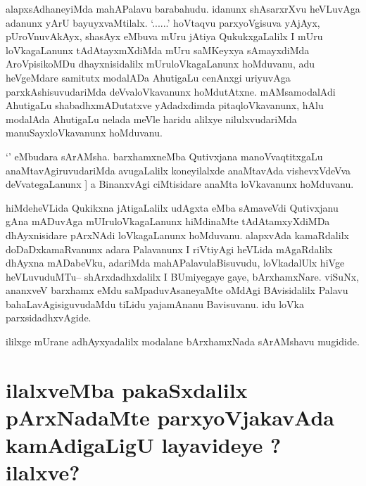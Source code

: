 \begin{artha}
alapxsAdhaneyiMda mahAPalavu barabahudu. idanunx shAsarxrXvu heVLuvAga adanunx yArU bayuyxvaMtilalx. `\stext ......' hoVtaqvu parxyoVgisuva yAjAyx, pUroVnuvAkAyx, shasAyx eMbuva mUru jAtiya QukukxgaLalilx I mUru loVkagaLanunx tAdAtayxmXdiMda  mUru saMKeyxya sAmayxdiMda AroVpisikoMDu dhayxnisidalilx mUruloVkagaLanunx hoMduvanu, adu heVgeMdare samitutx modalADa AhutigaLu cenAnxgi uriyuvAga parxkAshisuvudariMda deVvaloVkavanunx hoMdutAtxne. mAMsamodalAdi AhutigaLu shabadhxmADutatxve yAdadxdimda pitaqloVkavanunx, hAlu modalAda AhutigaLu nelada meVle haridu alilxye nilulxvudariMda manuSayxloVkavanunx hoMduvanu.

`\stext' eMbudara sArAMsha. barxhamxneMba Qutivxjana manoVvaqtitxgaLu 
anaMtavAgiruvudariMda avugaLalilx koneyilalxde anaMtavAda vishevxVdeVva deVvategaLanunx ]
a BinanxvAgi ciMtisidare anaMta loVkavanunx hoMduvanu.
\end{artha}

\begin{center}
\end{center}

\begin{artha}
hiMdeheVLida  Qukikxna jAtigaLalilx udAgxta eMba sAmaveVdi Qutivxjanu  gAna mADuvAga mUIruloVkagaLanunx hiMdinaMte tAdAtamxyXdiMDa dhAyxnisidare pArxNAdi loVkagaLanunx hoMduvanu. alapxvAda kamaRdalilx doDaDxkamaRvanunx adara Palavanunx I riVtiyAgi heVLida mAgaRdalilx dhAyxna mADabeVku, adariMda mahAPalavulaBisuvudu, loVkadalUlx hiVge heVLuvuduMTu-- shArxdadhxdalilx I BUmiyegaye gaye, bArxhamxNare. viSuNx, ananxveV barxhamx eMdu saMpaduvAsaneyaMte oMdAgi BAvisidalilx Palavu bahaLavAgisiguvudaMdu tiLidu yajamAnanu Bavisuvanu. idu loVka parxsidadhxvAgide.
\end{artha}

\begin{center}
ililxge mUrane adhAyxyadalilx modalane bArxhamxNada sArAMshavu mugidide.
\end{center}

\section*{ilalxveMba pakaSxdalilx pArxNadaMte parxyoVjakavAda kamAdigaLigU layavideye ? 
ilalxve?}



